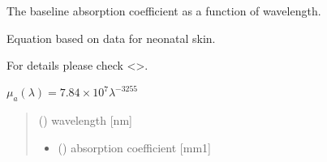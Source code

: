 \documentclass[letterpaper,10pt,english]{sphinxmanual}
\begin{document}
\begin{fulllineitems}
\label{\detokenize{03_absorption_coefficient:skinoptics.absorption_coefficient.mua_baseline2}}
\pysigstartsignatures
{}
\pysigstopsignatures
\begin{DUlineblock}{0em}
\item[] The baseline absorption coefficient as a function of wavelength.
\item[] Equation based on data for neonatal skin.
\item[] For details please check \textless{}\textgreater{}.
\end{DUlineblock}

\sphinxAtStartPar
\(\mu_a(\lambda) = 7.84 \times 10^7 \lambda^{-3255}\)
\begin{quote}\begin{description}
\sphinxAtStartPar
{} () \textendash{} wavelength {[}nm{]}

\sphinxAtStartPar
\begin{itemize}
\item {} 
\sphinxAtStartPar
{} () \textendash{} absorption coefficient {[}mm\sphinxhyphen{}1{]}

\end{itemize}


\end{description}\end{quote}

\end{fulllineitems}

\end{document}
